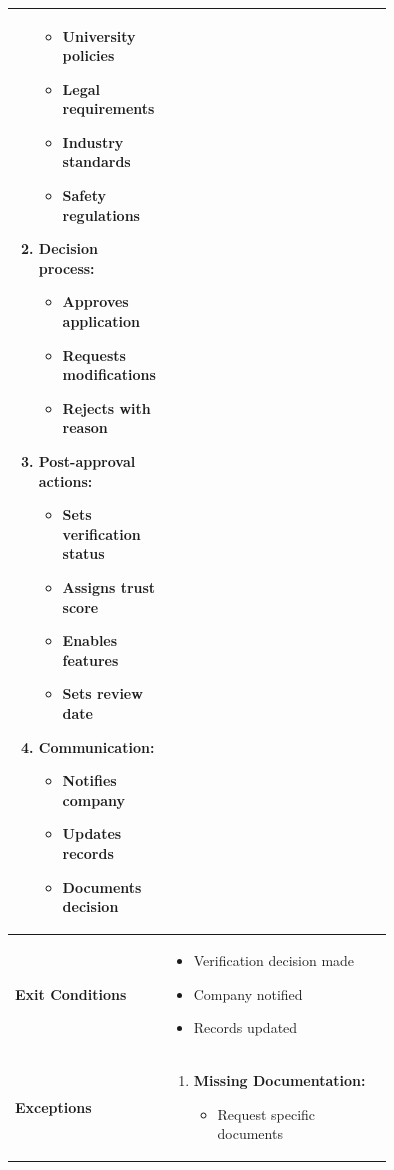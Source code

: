 \begin{longtable}{|l|p{0.75\linewidth}|}
\begin{enumerate}
\begin{itemize}
            \item University policies
            \item Legal requirements
            \item Industry standards
            \item Safety regulations
        \end{itemize}
        \item Decision process:
        \begin{itemize}
            \item Approves application
            \item Requests modifications
            \item Rejects with reason
        \end{itemize}
        \item Post-approval actions:
        \begin{itemize}
            \item Sets verification status
            \item Assigns trust score
            \item Enables features
            \item Sets review date
        \end{itemize}
        \item Communication:
        \begin{itemize}
            \item Notifies company
            \item Updates records
            \item Documents decision
        \end{itemize}
    \end{enumerate} \\
    \hline
    \textbf{Exit Conditions}   & 
    \begin{itemize}
        \item Verification decision made
        \item Company notified
        \item Records updated
    \end{itemize} \\
    \hline
    \textbf{Exceptions}       & 
    \begin{enumerate}
        \item \textbf{Missing Documentation:}
        \begin{itemize}
            \item Request specific documents

\end{itemize}
\end{enumerate}
\end{longtable}
